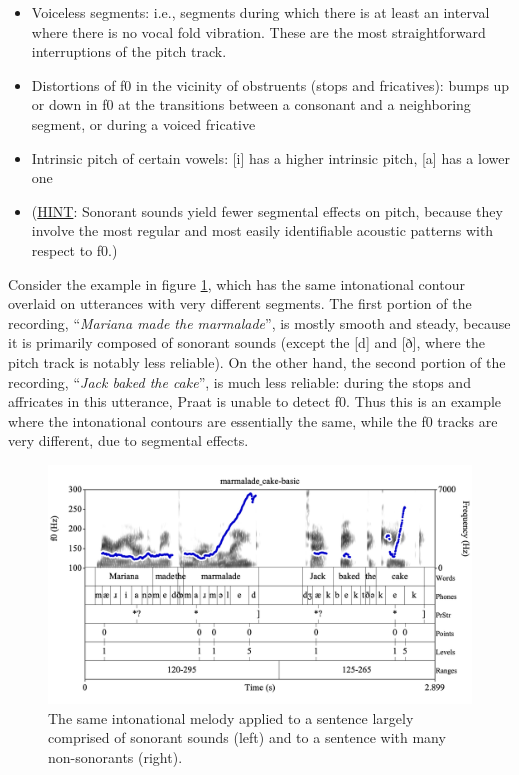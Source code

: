 \documentclass[11pt, twoside]{memoir}
\def\langtext#1{\textit{#1}}
\begin{document}
\begin{itemize}
\item Voiceless segments: i.e., segments during which there is at least an interval where there is no vocal fold vibration. These are the most straightforward interruptions of the pitch track.
\item Distortions of f0 in the vicinity of obstruents (stops and fricatives): bumps up or down in f0 at the transitions between a consonant and a neighboring segment, or during a voiced fricative
\item Intrinsic pitch of certain vowels: [i] has a higher intrinsic pitch, [a] has a lower one 
\item[] (\uline{HINT}: Sonorant sounds yield fewer segmental effects on pitch, because they involve the most regular and most easily identifiable acoustic patterns with respect to f0.)
\end{itemize}

Consider the example in figure \ref{fig:marmalade cake f0-tracking}, which has the same intonational contour overlaid on utterances with very different segments. The first portion of the recording, “\langtext{Mariana made the marmalade}”, is mostly smooth and steady, because it is primarily composed of sonorant sounds (except the [d] and [ð], where the pitch track is notably less reliable). On the other hand, the second portion of the recording, “\langtext{Jack baked the cake}”, is much less reliable: during the stops and affricates in this utterance, Praat is unable to detect f0. Thus this is an example where the intonational contours are essentially the same, while the f0 tracks are very different, due to segmental effects.

\begin{figure}[H]
\centering
%
\includegraphics[width=.875\linewidth]{Appendix-marmalade_cake.png}
%
\caption{The same intonational melody applied to a sentence largely comprised of sonorant sounds (left) and to a sentence with many non-sonorants (right).%
\label{fig:marmalade cake f0-tracking}%
%
}
\end{figure}
\end{document}
